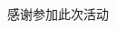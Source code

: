 \begin{CJK}{UTF8}{gbsn}
\PreLastFrame
\begin{frame}
	\centerline{\fontsize{32}{32}\selectfont 感谢参加此次活动}
\end{frame}

\newpage
\end{CJK}


